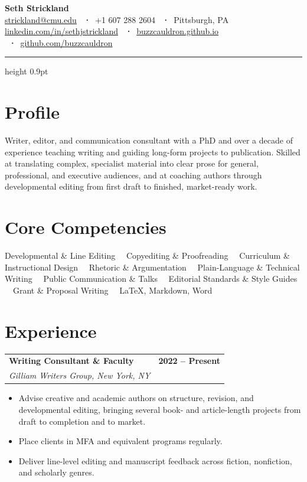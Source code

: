 \documentclass[11pt,letterpaper]{article}
\makeatletter
\newcommand{\entry}[4]{%
  \noindent\begin{tabularx}{\linewidth}{@{}X r@{}}
    \textbf{#1} & \textbf{#4}\\
    \textit{#2, #3} & \\
  \end{tabularx}\vspace{1pt}}
\makeatother
\begin{document}
{\Huge\bfseries\color{accent} Seth Strickland}\\[5pt]
{\small
  \href{mailto:strickland@cmu.edu}{strickland@cmu.edu} \ \textbf{·}\
  +1 607 288 2604 \ \textbf{·}\ Pittsburgh, PA\\[2pt]
  \href{https://linkedin.com/in/sethjstrickland}{linkedin.com/in/sethjstrickland} \ \textbf{·}\
  \href{https://buzzcauldron.github.io}{buzzcauldron.github.io} \ \textbf{·}\
  \href{https://github.com/buzzcauldron}{github.com/buzzcauldron}
}\\[4pt]
{\color{rulecol}\hrule height 0.9pt}
\vspace{4pt}

\section{Profile}
Writer, editor, and communication consultant with a PhD and over a decade of experience teaching
writing and guiding long-form projects to publication. Skilled at translating complex, specialist
material into clear prose for general, professional, and executive audiences, and at coaching authors
through developmental editing from first draft to finished, market-ready work.

\section{Core Competencies}
Developmental \& Line Editing \ \textbullet\ Copyediting \& Proofreading \ \textbullet\ Curriculum \&
Instructional Design \ \textbullet\ Rhetoric \& Argumentation \ \textbullet\ Plain-Language \& Technical
Writing \ \textbullet\ Public Communication \& Talks \ \textbullet\ Editorial Standards \& Style Guides
\ \textbullet\ Grant \& Proposal Writing \ \textbullet\ LaTeX, Markdown, Word

\section{Experience}

\entry{Writing Consultant \& Faculty}{Gilliam Writers Group}{New York, NY}{2022 -- Present}
\begin{itemize}
  \item Advise creative and academic authors on structure, revision, and developmental editing, bringing several book- and article-length projects from draft to completion and to market.
  \item Place clients in MFA and equivalent programs regularly.
  \item Deliver line-level editing and manuscript feedback across fiction, nonfiction, and scholarly genres.
\end{itemize}
\vspace{5pt}
\end{document}
